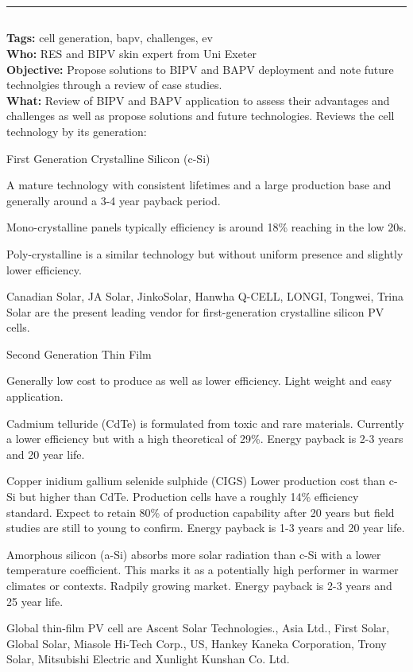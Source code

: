 \documentclass[11pt,a4paper]{article}
\newenvironment{itemize*}%
  {\begin{itemize}[rightmargin=\dimexpr\linewidth-120mm-\leftmargin\relax]%
    \setlength{\itemsep}{0pt}%
    \setlength{\parskip}{0pt}}%
  {\end{itemize}}
\begin{document}
\noindent\rule{\textwidth}{1pt}
\subsection*{}
\textbf{Tags:} cell generation, bapv, challenges, ev \\
\textbf{Who:} RES and BIPV skin expert from Uni Exeter \\
\textbf{Objective:}  Propose solutions to BIPV and BAPV deployment and note future technolgies through a review of case studies. \\
\textbf{What:} Review of BIPV and BAPV application to assess their advantages and challenges as well as propose solutions and future technologies. Reviews the cell technology by its generation:

First Generation Crystalline Silicon (c-Si)
\begin{itemize*}
    \item A mature technology with consistent lifetimes and a large production base and generally around a 3-4 year payback period.
    \item Mono-crystalline panels typically efficiency is around 18\% reaching in the low 20s.
    \item Poly-crystalline is a similar technology but without uniform presence and slightly lower efficiency. 
    \item Canadian Solar, JA Solar, JinkoSolar, Hanwha Q-CELL, LONGI, Tongwei, Trina Solar are the present leading vendor for first-generation crystalline silicon PV cells.
\end{itemize*}
Second Generation Thin Film
\begin{itemize*}
    \item Generally low cost to produce as well as lower efficiency. Light weight and easy application.
    \item Cadmium telluride (CdTe) is formulated from toxic and rare materials. Currently a lower efficiency but with a high theoretical of 29\%. Energy payback is 2-3 years and 20 year life.
    \item Copper inidium gallium selenide sulphide (CIGS) Lower production cost than c-Si but higher than CdTe. Production cells have a roughly 14\% efficiency standard. Expect to retain 80\% of production capability after 20 years but field studies are still to young to confirm. Energy payback is 1-3 years and 20 year life.
    \item Amorphous silicon (a-Si) absorbs more solar radiation than c-Si with a lower temperature coefficient. This marks it as a potentially high performer in warmer climates or contexts. Radpily growing market. Energy payback is 2-3 years and 25 year life.
    \item Global thin-film PV cell are Ascent Solar Technologies., Asia Ltd., First Solar, Global Solar, Miasole Hi-Tech Corp., US, Hankey Kaneka Corporation, Trony Solar, Mitsubishi Electric and Xunlight Kunshan Co. Ltd.
\end{itemize*}
\end{document}
